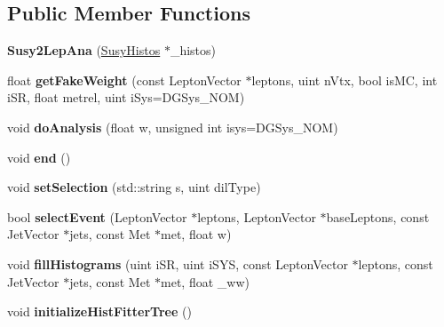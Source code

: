 \subsection*{Public Member Functions}
\begin{DoxyCompactItemize}
\item 
\hypertarget{classSusy2LepAna_a0237540d04fdc88c660b0caa57358dd2}{
{\bfseries Susy2LepAna} (\hyperlink{classSusyHistos}{SusyHistos} $\ast$\_\-histos)}
\label{classSusy2LepAna_a0237540d04fdc88c660b0caa57358dd2}

\item 
\hypertarget{classSusy2LepAna_a5be35d360519d524621450274f4a3d37}{
float {\bfseries getFakeWeight} (const LeptonVector $\ast$leptons, uint nVtx, bool isMC, int iSR, float metrel, uint iSys=DGSys\_\-NOM)}
\label{classSusy2LepAna_a5be35d360519d524621450274f4a3d37}

\item 
\hypertarget{classSusy2LepAna_a4b79edbd172829545eedb035414636ad}{
void {\bfseries doAnalysis} (float w, unsigned int isys=DGSys\_\-NOM)}
\label{classSusy2LepAna_a4b79edbd172829545eedb035414636ad}

\item 
\hypertarget{classSusy2LepAna_ae005ac716d400f5bead2d5a72e0c0a95}{
void {\bfseries end} ()}
\label{classSusy2LepAna_ae005ac716d400f5bead2d5a72e0c0a95}

\item 
\hypertarget{classSusy2LepAna_a1e90ba8b63135cd2d10a80b58043a171}{
void {\bfseries setSelection} (std::string s, uint dilType)}
\label{classSusy2LepAna_a1e90ba8b63135cd2d10a80b58043a171}

\item 
\hypertarget{classSusy2LepAna_ab5da399f55f2a125e9f267da7941575e}{
bool {\bfseries selectEvent} (LeptonVector $\ast$leptons, LeptonVector $\ast$baseLeptons, const JetVector $\ast$jets, const Met $\ast$met, float w)}
\label{classSusy2LepAna_ab5da399f55f2a125e9f267da7941575e}

\item 
\hypertarget{classSusy2LepAna_a8609fc82111b8c7b785cdfe2c53712a6}{
void {\bfseries fillHistograms} (uint iSR, uint iSYS, const LeptonVector $\ast$leptons, const JetVector $\ast$jets, const Met $\ast$met, float \_\-ww)}
\label{classSusy2LepAna_a8609fc82111b8c7b785cdfe2c53712a6}

\item 
\hypertarget{classSusy2LepAna_aedb67994c4929809a52c75505868046b}{
void {\bfseries initializeHistFitterTree} ()}
\label{classSusy2LepAna_aedb67994c4929809a52c75505868046b}


\end{DoxyCompactItemize}
